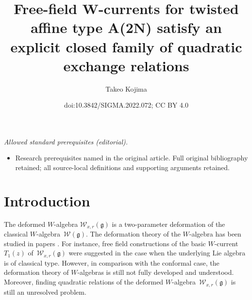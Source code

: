 \documentclass[10pt,a4paper]{amsart}
\title{Free-field W-currents for twisted affine type A(2N) satisfy an explicit closed family of quadratic exchange relations}
\author{Takeo Kojima}
\date{doi:10.3842/SIGMA.2022.072; CC BY 4.0}
\numberwithin{equation}{section}
\begin{document}
\maketitle
\noindent\textit{Allowed standard prerequisites (editorial).}\begin{itemize}
\item Research prerequisites named in the original article. Full original bibliography retained; all source-local definitions and supporting arguments retained.
\end{itemize}\medskip
\section{Introduction}

The deformed $W$-algebra ${\mathcal W}_{x,r}({\mathfrak g})$ is a two-parameter
deformation of the classical $W$-al\-ge\-bra~${\mathcal W}({\mathfrak g})$.
The deformation theory of the $W$-algebra has been studied in
{papers}
\cite{
Awata-Kubo-Odake-Shiraishi,Brazhnikov-Lukyanov,Ding-Feigin,
Feigin-Frenkel,Feigin-Jimbo-Mukhin-Vilkoviskiy,
Frenkel-Reshetikhin1,
Harada-Matsuo-Noshita-Watanabe,
Kojima2,Kojima1,
Odake,Sevostyanov,
Shiraishi-Kubo-Awata-Odake}.
For instance, free field constructions of the basic $W$-current $T_1(z)$ of~${\mathcal W}_{x,r}({\mathfrak g})$ were
{suggested in the case when the underlying Lie algebra is of classical type.}
However, in comparison with the conformal case,
the deformation theory of $W$-algebras
is still not fully developed and understood.
Moreover, finding quadratic relations of the deformed
$W$-algebra~${\mathcal W}_{x,r}({\mathfrak g})$ is still an unresolved problem.
\end{document}
